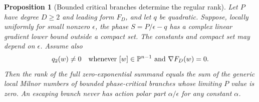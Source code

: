 \documentclass[11pt]{article}
\newtheorem{proposition}[theorem]{Proposition}
\theoremstyle{definition}\newtheorem{definition}[theorem]{Definition}
\theoremstyle{remark}\newtheorem{remark}[theorem]{Remark}
\begin{document}
\begin{proposition}[Bounded critical branches determine the regular rank]
\label{prop:boundedregularrank}
Let $P$ have degree $D\ge2$ and leading form $F_D$, and let $q$
be quadratic. Suppose, locally uniformly for small nonzero
$\epsilon$, the phase $S=P/\epsilon-q$ has a complex linear
gradient lower bound outside a compact set. The constants and
compact set may depend on $\epsilon$. Assume also
\begin{equation}\label{eq:nonisoleading}
 q_2(w)\ne0\quad\hbox{whenever }[w]\in\mathbb P^{n-1}
                           \hbox{ and }\nabla F_D(w)=0.
\end{equation}
Then the rank of the full zero-exponential summand equals the sum
of the generic local Milnor numbers of bounded phase-critical
branches whose limiting $P$ value is zero. An escaping branch
never has action polar part $\alpha/\epsilon$ for any constant
$\alpha$.
\end{proposition}
\end{document}
